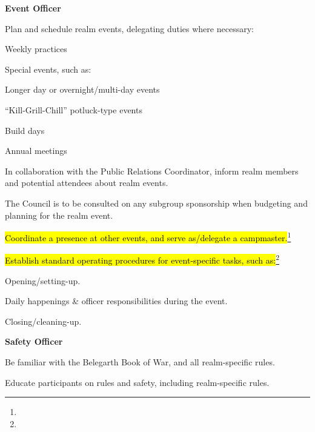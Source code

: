 \documentclass[12pt]{article}
\newcommand{\newpart}[2][]{\hl{#2}\expandafter\ifx\expandafter\relax\detokenize{#1}\relax\else\textnormal{\footnote{#1}}\fi}
\begin{document}
\begin{level}
\begin{level}
\begin{level}
        \end{level}
        \item \textbf{Event Officer}
        \begin{level}
            \item Plan and schedule realm events, delegating duties where necessary:
            \begin{level}
                \item Weekly practices
                \item Special events, such as:
                \begin{level}
                    \item Longer day or overnight/multi-day events
                    \item “Kill-Grill-Chill” potluck-type events
                \end{level}
                \item Build days
                \item Annual meetings
            \end{level}
            \item In collaboration with the Public Relations Coordinator, inform realm members and potential attendees about realm events.
            \item The Council is to be consulted on any subgroup sponsorship when budgeting and planning for the realm event.
            \item \newpart{Coordinate a presence at other events, and serve as/delegate a campmaster.}
            \item \newpart{Establish standard operating procedures for event-specific tasks, such as:}
            \begin{level}
                \item Opening/setting-up.
                \item Daily happenings \& officer responsibilities during the event.
                \item Closing/cleaning-up.
            \end{level}
        \end{level}
        \item \textbf{Safety Officer}
        \begin{level}
            \item Be familiar with the Belegarth Book of War, and all realm-specific rules.
            \item Educate participants on rules and safety, including realm-specific rules. 

\end{level}
\end{level}
\end{level}
\end{document}
